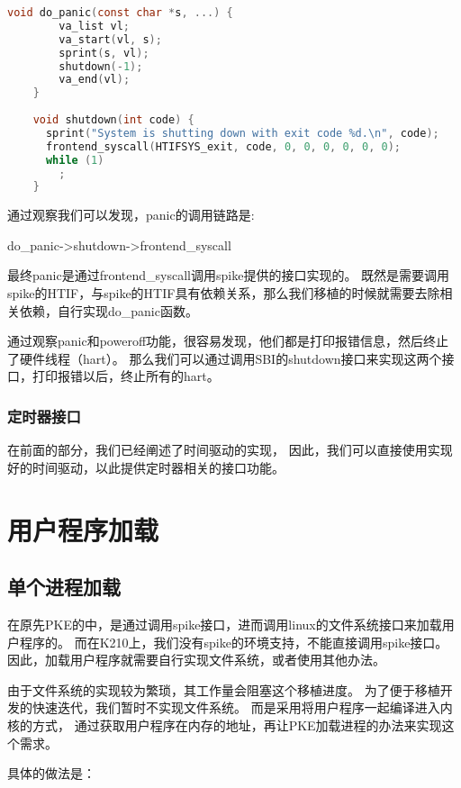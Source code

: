 \begin{lstlisting}[language=C, caption={panic实现代码}, label={lst:panic} ]
    void do_panic(const char *s, ...) {
        va_list vl;
        va_start(vl, s);
        sprint(s, vl);
        shutdown(-1);
        va_end(vl);
    }
    
    void shutdown(int code) {
      sprint("System is shutting down with exit code %d.\n", code);
      frontend_syscall(HTIFSYS_exit, code, 0, 0, 0, 0, 0, 0);
      while (1)
        ;
    }    
\end{lstlisting}

通过观察我们可以发现，panic的调用链路是:

do\_panic->shutdown->frontend\_syscall

最终panic是通过frontend\_syscall调用spike提供的接口实现的。
既然是需要调用spike的HTIF，与spike的HTIF具有依赖关系，那么我们移植的时候就需要去除相关依赖，自行实现do\_panic函数。

通过观察panic和poweroff功能，很容易发现，他们都是打印报错信息，然后终止了硬件线程（hart）。
那么我们可以通过调用SBI的shutdown接口来实现这两个接口，打印报错以后，终止所有的hart。

\subsubsection{定时器接口}

在前面的部分，我们已经阐述了时间驱动的实现，
因此，我们可以直接使用实现好的时间驱动，以此提供定时器相关的接口功能。


\section{用户程序加载}

\subsection{单个进程加载}

在原先PKE的中，是通过调用spike接口，进而调用linux的文件系统接口来加载用户程序的。
而在K210上，我们没有spike的环境支持，不能直接调用spike接口。
因此，加载用户程序就需要自行实现文件系统，或者使用其他办法。

由于文件系统的实现较为繁琐，其工作量会阻塞这个移植进度。
为了便于移植开发的快速迭代，我们暂时不实现文件系统。
而是采用将用户程序一起编译进入内核的方式，
通过获取用户程序在内存的地址，再让PKE加载进程的办法来实现这个需求。

具体的做法是：

